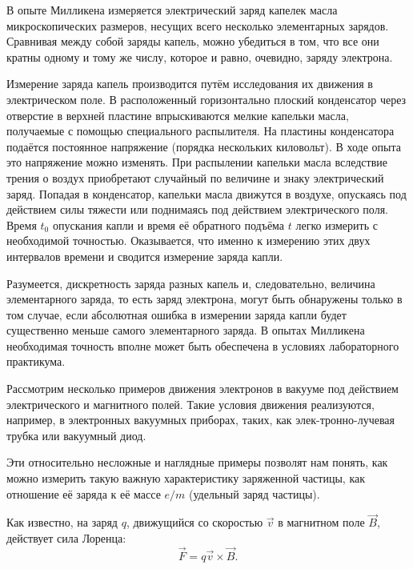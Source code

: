 В опыте Милликена измеряется электрический заряд капелек масла микроскопических размеров, несущих всего несколько
элементарных зарядов. Сравнивая между собой заряды капель, можно убедиться в том, что все они кратны одному и тому же числу, которое и равно, очевидно, заряду электрона.

Измерение заряда капель производится путём исследования их движения в электрическом поле. В расположенный горизонтально плоский конденсатор через отверстие в верхней пластине впрыскиваются мелкие капельки масла, получаемые с помощью специального распылителя. На пластины конденсатора подаётся постоянное напряжение (порядка нескольких киловольт). В ходе опыта это напряжение можно изменять. При распылении капельки масла вследствие трения о воздух приобретают случайный по величине и знаку электрический заряд. Попадая в конденсатор, капельки масла движутся в воздухе, опускаясь под действием силы тяжести или поднимаясь под действием электрического поля. Время $t_0$ опускания капли и время её обратного подъёма $t$ легко измерить с необходимой точностью. Оказывается, что именно к измерению этих двух интервалов времени и сводится измерение заряда капли.

Разумеется, дискретность заряда разных капель и, следовательно, величина элементарного заряда, то есть заряд электрона, могут быть обнаружены только в том случае, если абсолютная ошибка в измерении заряда капли будет существенно меньше самого элементарного заряда. В опытах Милликена необходимая точность вполне может быть обеспечена в условиях лабораторного практикума.


Рассмотрим несколько примеров движения электронов в вакууме под действием электрического и магнитного полей. Такие
условия движения реализуются, например, в электронных вакуумных приборах, таких, как элек-тронно-лучевая трубка или
вакуумный диод.

Эти относительно несложные и наглядные примеры позволят нам понять, как можно измерить такую важную характеристику
заряженной частицы, как отношение её заряда к её массе $e/m$ (удельный заряд частицы).


Как известно, на заряд $q$, движущийся со скоростью $\vec{v}$ в магнитном поле $\vec{B}$, действует сила Лоренца:
\begin{equation*}
	\vec{F}=q{\vec{v}}\times{\vec{B}}.
\end{equation*}

